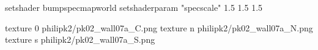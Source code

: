 setshader bumpspecmapworld
setshaderparam "specscale" 1.5 1.5 1.5

texture 0 philipk2/pk02_wall07a_C.png
texture n philipk2/pk02_wall07a_N.png
texture s philipk2/pk02_wall07a_S.png

